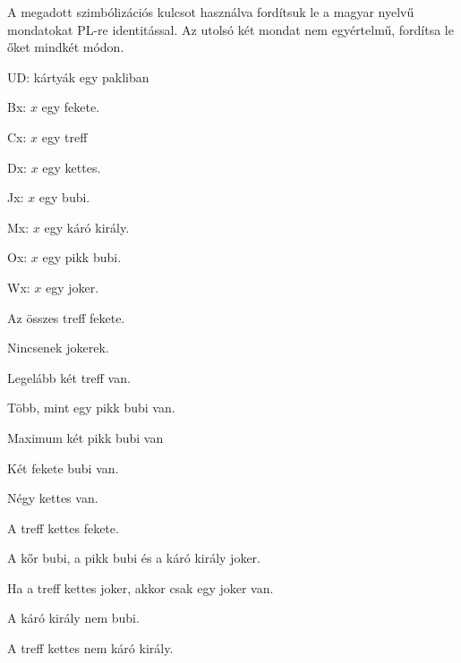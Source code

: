 \solutions
\problempart
\label{pr.QLcards}
A megadott szimbólizációs kulcsot használva fordítsuk le a magyar nyelvű mondatokat PL-re identitással. Az utolsó két mondat nem egyértelmű, fordítsa le őket mindkét módon.
\begin{ekey}
\item[UD:] kártyák egy pakliban
\item[Bx:] $x$ egy fekete.
\item[Cx:] $x$ egy treff
\item[Dx:] $x$ egy kettes.
\item[Jx:] $x$ egy bubi.
\item[Mx:] $x$ egy káró király.
\item[Ox:] $x$ egy pikk bubi.
\item[Wx:] $x$ egy joker.
\end{ekey}
\begin{earg}
\item Az összes treff fekete.
\item Nincsenek jokerek.
\item Legelább két treff van.
\item Több, mint egy pikk bubi van.
\item Maximum két pikk bubi van
\item Két fekete bubi van.
\item Négy kettes van.
\item A treff kettes fekete.
\item A kőr bubi, a pikk bubi és a káró király joker.
\item Ha a treff kettes joker, akkor csak egy joker van.
\item A káró király nem bubi.
\item A treff kettes nem káró király.
\end{earg}

